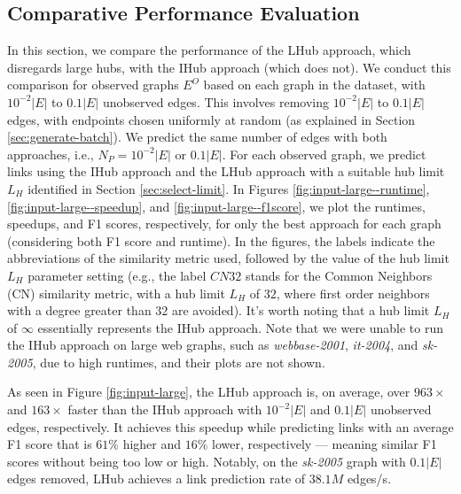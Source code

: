 \subsection{Comparative Performance Evaluation}

In this section, we compare the performance of the LHub approach, which disregards large hubs, with the IHub approach (which does not). We conduct this comparison for observed graphs $E^O$ based on each graph in the dataset, with $10^{-2}|E|$ to $0.1|E|$ unobserved edges. This involves removing $10^{-2}|E|$ to $0.1|E|$ edges, with endpoints chosen uniformly at random (as explained in Section \ref{sec:generate-batch}). We predict the same number of edges with both approaches, i.e., $N_P = 10^{-2}|E|$ or $0.1|E|$. For each observed graph, we predict links using the IHub approach and the LHub approach with a suitable hub limit $L_H$ identified in Section \ref{sec:select-limit}. In Figures \ref{fig:input-large--runtime}, \ref{fig:input-large--speedup}, and \ref{fig:input-large--f1score}, we plot the runtimes, speedups, and F1 scores, respectively, for only the best approach for each graph (considering both F1 score and runtime). In the figures, the labels indicate the abbreviations of the similarity metric used, followed by the value of the hub limit $L_H$ parameter setting (e.g., the label $CN32$ stands for the Common Neighbors (CN) similarity metric, with a hub limit $L_H$ of $32$, where first order neighbors with a degree greater than $32$ are avoided). It's worth noting that a hub limit $L_H$ of $\infty$ essentially represents the IHub approach. Note that we were unable to run the IHub approach on large web graphs, such as \textit{webbase-2001}, \textit{it-2004}, and \textit{sk-2005}, due to high runtimes, and their plots are not shown.





As seen in Figure \ref{fig:input-large}, the LHub approach is, on average, over $963\times$ and $163\times$ faster than the IHub approach with $10^{-2}|E|$ and $0.1|E|$ unobserved edges, respectively. It achieves this speedup while predicting links with an average F1 score that is $61\%$ higher and $16\%$ lower, respectively --- meaning similar F1 scores without being too low or high. Notably, on the \textit{sk-2005} graph with $0.1|E|$ edges removed, LHub achieves a link prediction rate of $38.1M$ edges/s.

